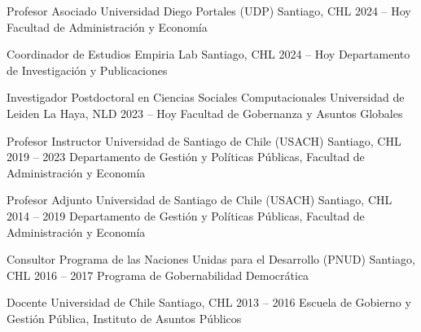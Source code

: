 





\begin{cventries}
\cventry
{Profesor Asociado} 
{Universidad Diego Portales (UDP)} 
{Santiago, CHL} 
{2024 -- Hoy}
{Facultad de Administración y Economía} \vspace{1.5mm}

\cventry
{Coordinador de Estudios} 
{Empiria Lab} 
{Santiago, CHL} 
{2024 -- Hoy}
{Departamento de Investigación y Publicaciones} \vspace{1.5mm}

\cventry
{Investigador Postdoctoral en Ciencias Sociales Computacionales} 
{Universidad de Leiden} 
{La Haya, NLD} 
{2023 -- Hoy}
{Facultad de Gobernanza y Asuntos Globales} \vspace{1.5mm}
\end{cventries}


\begin{cventries}
\cventry
{Profesor Instructor} 
{Universidad de Santiago de Chile (USACH)} 
{Santiago, CHL} 
{2019 -- 2023}
{Departamento de Gestión y Políticas Públicas, Facultad de Administración y Economía}\vspace{1.5mm}

\cventry
{Profesor Adjunto} 
{Universidad de Santiago de Chile (USACH)} 
{Santiago, CHL} 
{2014 -- 2019}
{Departamento de Gestión y Políticas Públicas, Facultad de Administración y Economía}\vspace{1.5mm}

\cventry
{Consultor} 
{Programa de las Naciones Unidas para el Desarrollo (PNUD)} 
{Santiago, CHL} 
{2016 -- 2017}
{Programa de Gobernabilidad Democrática} \vspace{1.5mm}

\cventry
{Docente} 
{Universidad de Chile} 
{Santiago, CHL} 
{2013 -- 2016}
{Escuela de Gobierno y Gestión Pública, Instituto de Asuntos Públicos}\vspace{1.5mm}
\end{cventries}
\pagebreak